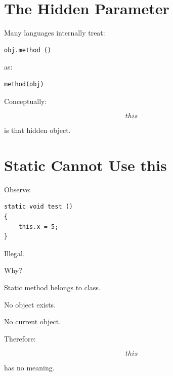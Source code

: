 \documentclass[11pt,a4paper]{book}
\begin{document}
\section{The Hidden Parameter}

Many languages internally treat:

\begin{verbatim}
obj.method ()
\end{verbatim}

as:

\begin{verbatim}
method(obj)
\end{verbatim}


Conceptually:

\[
this
\]

is that hidden object.


\section{Static Cannot Use this}

Observe:

\begin{verbatim}
static void test ()
{
    this.x = 5;
}
\end{verbatim}


Illegal.


Why?


Static method belongs to class.


No object exists.


No current object.


Therefore:

\[
this
\]

has no meaning.

\end{document}

